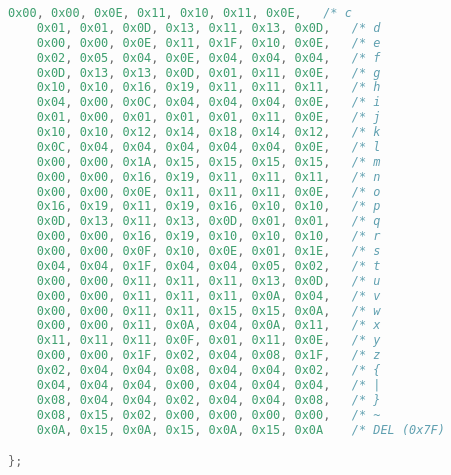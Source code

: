 \begin{lstlisting}[language=C]
    0x00, 0x00, 0x0E, 0x11, 0x10, 0x11, 0x0E,   /* c                        */
    0x01, 0x01, 0x0D, 0x13, 0x11, 0x13, 0x0D,   /* d                        */
    0x00, 0x00, 0x0E, 0x11, 0x1F, 0x10, 0x0E,   /* e                        */
    0x02, 0x05, 0x04, 0x0E, 0x04, 0x04, 0x04,   /* f                        */
    0x0D, 0x13, 0x13, 0x0D, 0x01, 0x11, 0x0E,   /* g                        */
    0x10, 0x10, 0x16, 0x19, 0x11, 0x11, 0x11,   /* h                        */
    0x04, 0x00, 0x0C, 0x04, 0x04, 0x04, 0x0E,   /* i                        */
    0x01, 0x00, 0x01, 0x01, 0x01, 0x11, 0x0E,   /* j                        */
    0x10, 0x10, 0x12, 0x14, 0x18, 0x14, 0x12,   /* k                        */
    0x0C, 0x04, 0x04, 0x04, 0x04, 0x04, 0x0E,   /* l                        */
    0x00, 0x00, 0x1A, 0x15, 0x15, 0x15, 0x15,   /* m                        */
    0x00, 0x00, 0x16, 0x19, 0x11, 0x11, 0x11,   /* n                        */
    0x00, 0x00, 0x0E, 0x11, 0x11, 0x11, 0x0E,   /* o                        */
    0x16, 0x19, 0x11, 0x19, 0x16, 0x10, 0x10,   /* p                        */
    0x0D, 0x13, 0x11, 0x13, 0x0D, 0x01, 0x01,   /* q                        */
    0x00, 0x00, 0x16, 0x19, 0x10, 0x10, 0x10,   /* r                        */
    0x00, 0x00, 0x0F, 0x10, 0x0E, 0x01, 0x1E,   /* s                        */
    0x04, 0x04, 0x1F, 0x04, 0x04, 0x05, 0x02,   /* t                        */
    0x00, 0x00, 0x11, 0x11, 0x11, 0x13, 0x0D,   /* u                        */
    0x00, 0x00, 0x11, 0x11, 0x11, 0x0A, 0x04,   /* v                        */
    0x00, 0x00, 0x11, 0x11, 0x15, 0x15, 0x0A,   /* w                        */
    0x00, 0x00, 0x11, 0x0A, 0x04, 0x0A, 0x11,   /* x                        */
    0x11, 0x11, 0x11, 0x0F, 0x01, 0x11, 0x0E,   /* y                        */
    0x00, 0x00, 0x1F, 0x02, 0x04, 0x08, 0x1F,   /* z                        */
    0x02, 0x04, 0x04, 0x08, 0x04, 0x04, 0x02,   /* {                        */
    0x04, 0x04, 0x04, 0x00, 0x04, 0x04, 0x04,   /* |                        */
    0x08, 0x04, 0x04, 0x02, 0x04, 0x04, 0x08,   /* }                        */
    0x08, 0x15, 0x02, 0x00, 0x00, 0x00, 0x00,   /* ~                        */
    0x0A, 0x15, 0x0A, 0x15, 0x0A, 0x15, 0x0A    /* DEL (0x7F)               */

};
\end{lstlisting}
